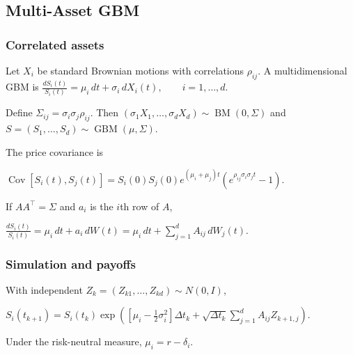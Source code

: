 



\subsection{Multi-Asset GBM}

\subsubsection*{Correlated assets}

Let $X_i$ be standard Brownian motions with correlations $\rho_{ij}$. A multidimensional GBM is
$\frac{dS_i(t)}{S_i(t)}=\mu_i\,dt+\sigma_i\,dX_i(t),\qquad i=1,\ldots,d$.

Define $\Sigma_{ij}=\sigma_i\sigma_j\rho_{ij}$. Then $(\sigma_1X_1,\ldots,\sigma_dX_d)\sim\operatorname{BM}(0,\Sigma)$ and $S=(S_1,\ldots,S_d)\sim\operatorname{GBM}(\mu,\Sigma)$.

The price covariance is

$\operatorname{Cov}[S_i(t),S_j(t)]=S_i(0)S_j(0)e^{(\mu_i+\mu_j)t}\left(e^{\rho_{ij}\sigma_i\sigma_jt}-1\right)$.

If $AA^\top=\Sigma$ and $a_i$ is the $i$th row of $A$,

$\frac{dS_i(t)}{S_i(t)}=\mu_i\,dt+a_i\,dW(t)=\mu_i\,dt+\sum_{j=1}^dA_{ij}\,dW_j(t)$.

\subsubsection*{Simulation and payoffs}

With independent $Z_k=(Z_{k1},\ldots,Z_{kd})\sim N(0,I)$,

$S_i(t_{k+1})=S_i(t_k)\exp\left(\left[\mu_i-\frac12\sigma_i^2\right]\Delta t_k+\sqrt{\Delta t_k}\sum_{j=1}^dA_{ij}Z_{k+1,j}\right)$.

Under the risk-neutral measure, $\mu_i=r-\delta_i$. 

